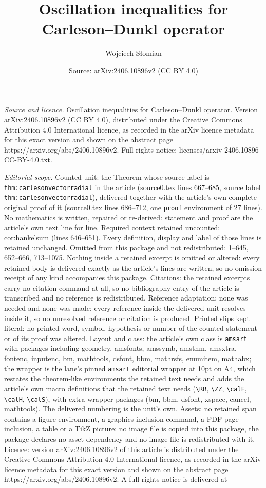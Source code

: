 \documentclass[10pt,a4paper]{amsart}
\title[Oscillation inequalities for Carleson--Dunkl operator]{Oscillation inequalities for Carleson--Dunkl operator}
\author{Wojciech S{\l}omian}
\date{Source: arXiv:2406.10896v2 (CC BY 4.0)}
\begin{document}
\maketitle

\noindent\emph{Source and licence.} Oscillation inequalities for Carleson--Dunkl operator. Version arXiv:2406.10896v2 (CC BY 4.0), distributed under the Creative Commons Attribution 4.0 International licence, as recorded in the arXiv licence metadata for this exact version and shown on the abstract page https://arxiv.org/abs/2406.10896v2. Full rights notice: licenses/arxiv-2406.10896-CC-BY-4.0.txt.\par\smallskip

\noindent\textit{Editorial scope.} Counted unit: the Theorem whose source label is \texttt{thm:carlesonvectorradial} in the article (source0.tex lines 667--685, source label \texttt{thm:carlesonvectorradial}), delivered together with the article's own complete original proof of it (source0.tex lines 686--712, one \texttt{proof} environment of 27 lines). No mathematics is written, repaired or re-derived: statement and proof are the article's own text line for line. Required context retained uncounted: cor:hankelsum (lines 646--651). Every definition, display and label of those lines is retained unchanged. Omitted from this package and not redistributed: 1--645, 652--666, 713--1075. Nothing inside a retained excerpt is omitted or altered: every retained body is delivered exactly as the article's lines are written, so no omission receipt of any kind accompanies this package. Citations: the retained excerpts carry no citation command at all, so no bibliography entry of the article is transcribed and no reference is redistributed. Reference adaptation: none was needed and none was made; every reference inside the delivered unit resolves inside it, so no unresolved reference or citation is produced. Printed slips kept literal: no printed word, symbol, hypothesis or number of the counted statement or of its proof was altered. Layout and class: the article's own class is \texttt{amsart} with packages including geometry, amsfonts, amssymb, amsthm, amsxtra, fontenc, inputenc, bm, mathtools, dsfont, bbm, mathrsfs, enumitem, mathabx; the wrapper is the lane's pinned \texttt{amsart} editorial wrapper at 10pt on A4, which restates the theorem-like environments the retained text needs and adds the article's own macro definitions that the retained text needs (\texttt{\textbackslash RR}, \texttt{\textbackslash ZZ}, \texttt{\textbackslash calF}, \texttt{\textbackslash calH}, \texttt{\textbackslash calS}), with extra wrapper packages (bm, bbm, dsfont, xspace, cancel, mathtools). The delivered numbering is the unit's own. Assets: no retained span contains a figure environment, a graphics-inclusion command, a PDF-page inclusion, a table or a TikZ picture; no image file is copied into this package, the package declares no asset dependency and no image file is redistributed with it. Licence: version arXiv:2406.10896v2 of this article is distributed under the Creative Commons Attribution 4.0 International licence, as recorded in the arXiv licence metadata for this exact version and shown on the abstract page https://arxiv.org/abs/2406.10896v2. A full rights notice is delivered at 
\end{document}
